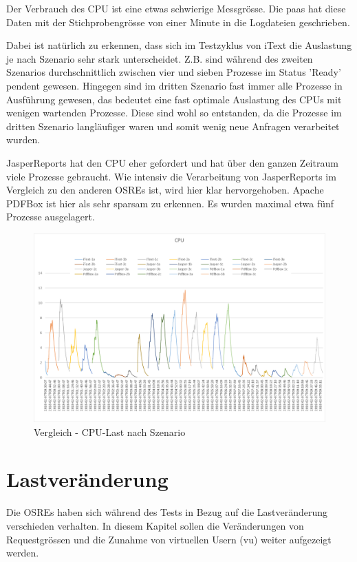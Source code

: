 \documentclass[main.tex]{subfiles}
\begin{document}
Der Verbrauch des CPU ist eine etwas schwierige Messgrösse. Die \acrshort{paas} hat diese Daten mit der Stichprobengrösse von einer Minute in die Logdateien geschrieben.

Dabei ist natürlich zu erkennen, dass sich im Testzyklus von iText  die Auslastung je nach Szenario sehr stark unterscheidet. Z.B. sind während des zweiten Szenarios durchschnittlich zwischen vier und sieben Prozesse im Status 'Ready' pendent gewesen. Hingegen sind im dritten Szenario fast immer alle Prozesse in Ausführung gewesen, das bedeutet eine fast optimale Auslastung des CPUs mit wenigen wartenden Prozesse. Diese sind wohl so entstanden, da die Prozesse im dritten Szenario langläufiger waren und somit wenig neue Anfragen verarbeitet wurden.

JasperReports hat den CPU eher gefordert und hat über den ganzen Zeitraum viele Prozesse gebraucht. Wie intensiv die Verarbeitung von JasperReports im Vergleich zu den anderen OSREs ist, wird hier klar hervorgehoben. Apache PDFBox ist hier als sehr sparsam zu erkennen. Es wurden maximal etwa 
fünf Prozesse ausgelagert. 
\begin{figure}[H]
\includegraphics[width=\textwidth]{mainpart/4_analyse_img/CPUVergleich.png}
 \caption{Vergleich - CPU-Last nach Szenario}
 \label{figure:cpuVergleich}
\end{figure}


\section{Lastveränderung}

Die OSREs haben sich während des Tests in Bezug auf die Lastveränderung verschieden verhalten. In diesem Kapitel sollen die Veränderungen von Requestgrössen und die Zunahme von virtuellen Usern (\acrshort{vu}) weiter aufgezeigt werden.
\end{document}
